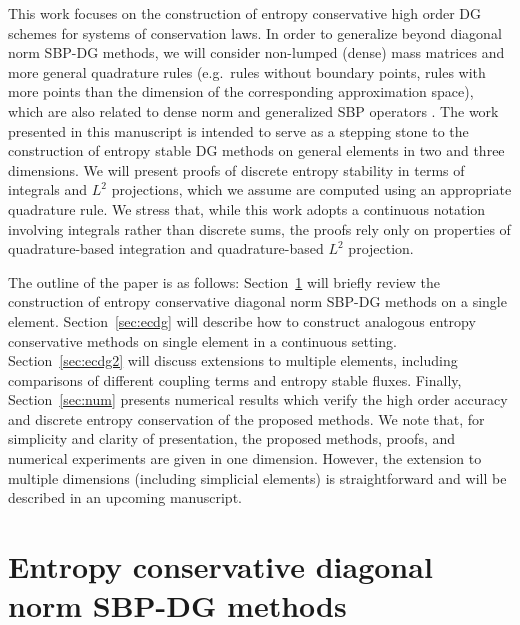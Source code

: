 \documentclass[preprint,10pt]{elsarticle}
\theoremstyle{definition}
\theoremstyle{lemma}
\theoremstyle{theorem}
\theoremstyle{assumption}
\newcommand{\note}[1]{{\color{blue}{#1}}}
\begin{document}
This work focuses on the construction of entropy conservative high order DG schemes for systems of conservation laws.  In order to generalize beyond diagonal norm SBP-DG methods, we will consider non-lumped (dense) mass matrices and more general quadrature rules (e.g.\ rules without boundary points, rules with more points than the dimension of the corresponding approximation space), which are also related to dense norm and generalized SBP operators \cite{fernandez2014generalized, ranocha2016summation, ranocha2017extended, ranocha2017comparison}.  The work presented in this manuscript is intended to serve as a stepping stone to the construction of entropy stable DG methods on general elements in two and three dimensions.  We will present proofs of discrete entropy stability in terms of integrals and $L^2$ projections, which we assume are computed using an appropriate quadrature rule.  We stress that, while this work adopts a continuous notation involving integrals rather than discrete sums, the proofs rely only on properties of quadrature-based integration and quadrature-based $L^2$ projection.  

The outline of the paper is as follows: Section~\ref{sec:intro} will briefly review the construction of entropy conservative diagonal norm SBP-DG methods on a single element.  Section~\ref{sec:ecdg} will describe how to construct analogous entropy conservative methods on single element in a continuous setting.  Section~\ref{sec:ecdg2} will discuss extensions to multiple elements, including comparisons of different coupling terms and entropy stable fluxes.  Finally, Section~\ref{sec:num} presents numerical results which verify the high order accuracy and discrete entropy conservation of the proposed methods.  We note that, for simplicity and clarity of presentation, the proposed methods, proofs, and numerical experiments are given in one dimension.  However, the extension to multiple dimensions (including simplicial elements) is straightforward and will be described in an upcoming manuscript.  




\section{Entropy conservative diagonal norm SBP-DG methods}
\label{sec:intro}
\end{document}

